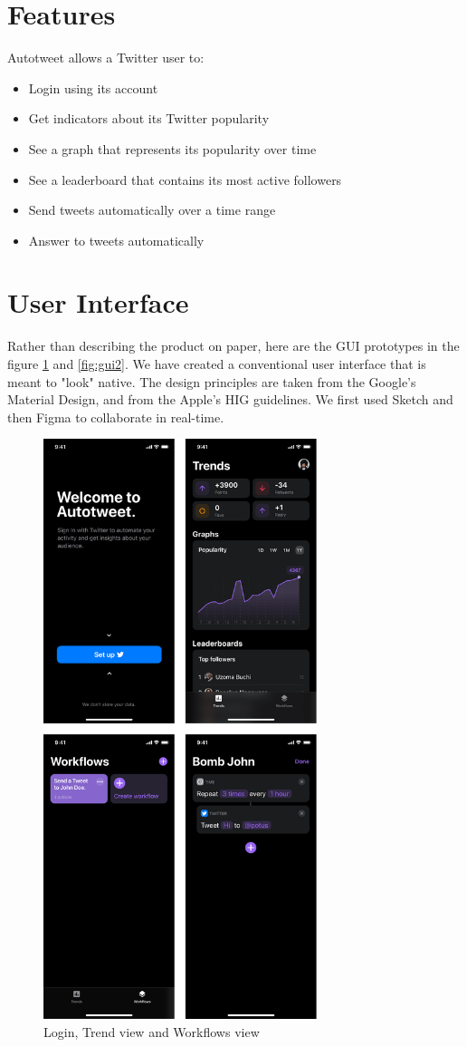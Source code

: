 \documentclass{report}
\begin{document}
\section{Features}
Autotweet allows a Twitter user to:
\begin{itemize}
\item Login using its account
\item Get indicators about its Twitter popularity
\item See a graph that represents its popularity over time
\item See a leaderboard that contains its most active followers
\item Send tweets automatically over a time range
\item Answer to tweets automatically

\end{itemize}

\section{User Interface}
Rather than describing the product on paper, here are the GUI prototypes in the figure \ref{fig:gui} and \ref{fig:gui2}. We have created a conventional user interface that is meant to "look" native. The design principles are taken from the Google's Material Design, and from the Apple's HIG guidelines. We first used Sketch and then Figma to collaborate in real-time.

\begin{figure}[htp]
    \centering
    \includegraphics[width=8cm]{gui}
    \caption{Login, Trend view and Workflows view}
    \label{fig:gui}
\end{figure}
\end{document}
